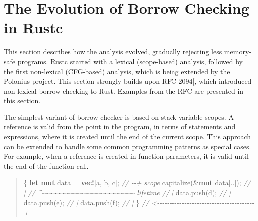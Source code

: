 \documentclass[
  11pt,
  twoside]{report}
\newenvironment{Shaded}{}{}
\newcommand{\CharTok}[1]{#1}
\newcommand{\CommentTok}[1]{\textit{#1}}
\newcommand{\KeywordTok}[1]{\textbf{#1}}
\newcommand{\NormalTok}[1]{#1}
\newcommand{\OperatorTok}[1]{#1}
\newcommand{\PreprocessorTok}[1]{\textbf{#1}}
\begin{document}
\section{The Evolution of Borrow Checking in Rustc}\label{sec:evolution}

This section describes how the analysis evolved, gradually rejecting
less memory-safe programs. Rustc started with a lexical (scope-based)
analysis, followed by the first non-lexical (CFG-based) analysis, which
is being extended by the Polonius project. This section strongly builds
upon RFC 2094{[}\citeproc{ref-rfc2094nll}{7}{]}, which introduced
non-lexical borrow checking to Rust. Examples from the RFC are presented
in this section.

The simplest variant of borrow checker is based on stack variable
scopes. A reference is valid from the point in the program, in terms of
statements and expressions, where it is created until the end of the
current scope. This approach can be extended to handle some common
programming patterns as special cases. For example, when a reference is
created in function parameters, it is valid until the end of the
function call.

\begin{quote}
\begin{Shaded}
\begin{Highlighting}[]
\OperatorTok{\{}
    \KeywordTok{let} \KeywordTok{mut}\NormalTok{ data }\OperatorTok{=} \PreprocessorTok{vec!}\NormalTok{[}\CharTok{\textquotesingle{}a\textquotesingle{}}\OperatorTok{,} \CharTok{\textquotesingle{}b\textquotesingle{}}\OperatorTok{,} \CharTok{\textquotesingle{}c\textquotesingle{}}\NormalTok{]}\OperatorTok{;} \CommentTok{// {-}{-}+ \textquotesingle{}scope}
\NormalTok{    capitalize(}\OperatorTok{\&}\KeywordTok{mut}\NormalTok{ data[}\OperatorTok{..}\NormalTok{])}\OperatorTok{;}          \CommentTok{//   |}
 \CommentTok{// \^{}\textasciitilde{}\textasciitilde{}\textasciitilde{}\textasciitilde{}\textasciitilde{}\textasciitilde{}\textasciitilde{}\textasciitilde{}\textasciitilde{}\textasciitilde{}\textasciitilde{}\textasciitilde{}\textasciitilde{}\textasciitilde{}\textasciitilde{}\textasciitilde{}\textasciitilde{}\textasciitilde{}\textasciitilde{}\textasciitilde{}\textasciitilde{}\textasciitilde{}\textasciitilde{}\textasciitilde{} \textquotesingle{}lifetime //   |}
\NormalTok{    data}\OperatorTok{.}\NormalTok{push(}\CharTok{\textquotesingle{}d\textquotesingle{}}\NormalTok{)}\OperatorTok{;}                     \CommentTok{//   |}
\NormalTok{    data}\OperatorTok{.}\NormalTok{push(}\CharTok{\textquotesingle{}e\textquotesingle{}}\NormalTok{)}\OperatorTok{;}                     \CommentTok{//   |}
\NormalTok{    data}\OperatorTok{.}\NormalTok{push(}\CharTok{\textquotesingle{}f\textquotesingle{}}\NormalTok{)}\OperatorTok{;}                     \CommentTok{//   |}
\OperatorTok{\}} \CommentTok{// \textless{}{-}{-}{-}{-}{-}{-}{-}{-}{-}{-}{-}{-}{-}{-}{-}{-}{-}{-}{-}{-}{-}{-}{-}{-}{-}{-}{-}{-}{-}{-}{-}{-}{-}{-}{-}{-}{-}{-}{-}+}
\end{Highlighting}
\end{Shaded}
\end{quote}
\end{document}
